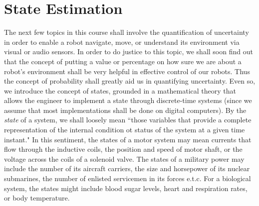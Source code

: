 \chapter{State Estimation}
\label{chap:state_ext}

The next few topics in this course shall involve the quantification of uncertainty in order to enable a robot navigate, move, or understand its environment via visual or audio sensors. In order to do justice to this topic, we shall soon find out that the concept of putting a value or percentage on how sure we are about a robot's environment shall be very helpful in effective control of our robots. Thus the concept of probability shall greatly aid us in quantifying uncertainty. Even so, we introduce the concept of states, grounded in a mathematical theory that allows the engineer to implement a state through discrete-time systems (since we assume that most implementations shall be done on digital computers). By the \textit{state} of a system, we shall loosely mean ``those variables that provide a complete representation of the internal condition ot status of the system at a given time instant." In this sentiment, the states of a motor system may mean currents that flow through the inductive coils, the position and speed of motor shaft, or the voltage across the coils of a solenoid valve. The states of a military power may include the number of its aircraft carriers, the size and horsepower of its nuclear submarines, the number of enlisted servicemen in its forces e.t.c. For a biological system, the states might include blood sugar levels, heart and respiration rates, or body temperature.

